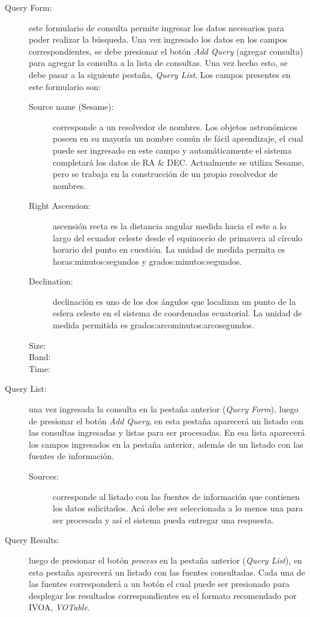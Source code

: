 \begin{description}
  \item [Query Form:] este formulario de consulta permite ingresar los
    datos necesarios para poder realizar la búsqueda. Una vez
    ingresado los datos en los campos correspondientes, se debe
    presionar el botón \emph{Add Query} (agregar consulta) para
    agregar la consulta a la lista de consultas. Una vez hecho esto,
    se debe pasar a la siguiente pestaña, \emph{Query List}. Los
    campos presentes en este formulario son:
    \begin{description}
      \item [Source name (Sesame):] corresponde a un resolvedor de
	nombres. Los objetos astronómicos poseen en su mayoría un
	nombre común de fácil aprendizaje, el cual puede ser ingresado
	en este campo y automáticamente el sistema completará los
	datos de RA \& DEC. Actualmente se utiliza Sesame, pero se
	trabaja en la construcción de un propio resolvedor de nombres.
      \item [Right Ascension:] ascensión recta es la distancia angular
	medida hacia el este a lo largo del ecuador celeste desde el
	equinoccio de primavera al círculo horario del punto en
	cuestión. La unidad de medida permita es
	horas:minutos:segundos y grados:minutos:segundos.
      \item [Declination:] declinación es uno de los dos ángulos que
	localizan un punto de la esfera celeste en el sistema de
	coordenadas ecuatorial. La unidad de medida permitida es
	grados:arcominutos:arcosegundos.
      \item [Size:] 
      \item [Band:]
      \item [Time:]
    \end{description}  
  \item [Query List:] una vez ingresada la consulta en la pestaña
    anterior (\emph{Query Form}), luego de presionar el botón
    \emph{Add Query}, en esta pestaña aparecerá un listado con las
    consultas ingresadas y listas para ser procesadas. En esa lista
    aparecerá los campos ingresados en la pestaña anterior, además de
    un listado con las fuentes de información.
    \begin{description}
      \item [Sources:] corresponde al listado con las fuentes de
	información que contienen los datos solicitados. Acá debe ser
	seleccionada a lo menos una para ser procesada y así el
	sistema pueda entregar una respuesta.
    \end{description}  
  \item [Query Results:] luego de presionar el botón \emph{process} en
    la pestaña anterior (\emph{Query List}), en esta pestaña
    aparecerá un listado con las fuentes consultadas. Cada una de las
    fuentes corresponderá a un botón el cual puede ser presionado para
    desplegar los resultados correspondientes en el formato
    recomendado por IVOA, \emph{VOTable}.
\end{description}


